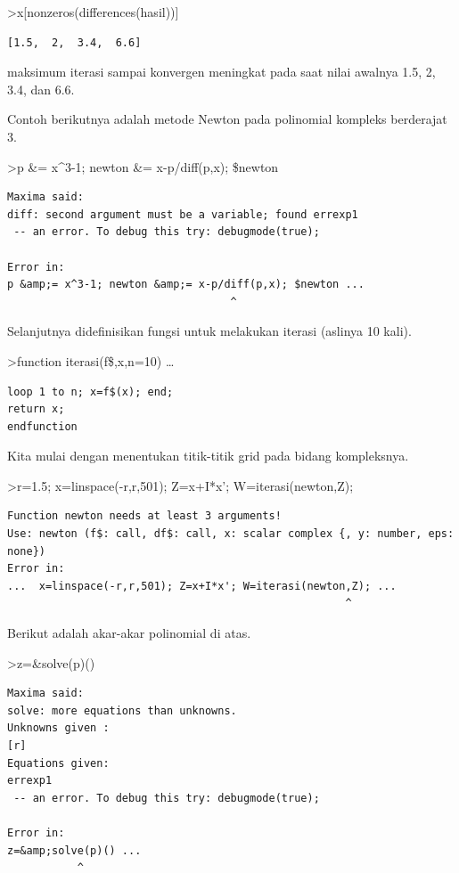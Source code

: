 \documentclass[
]{book}
\begin{document}
\textgreater x{[}nonzeros(differences(hasil)){]}

\begin{verbatim}
[1.5,  2,  3.4,  6.6]
\end{verbatim}

maksimum iterasi sampai konvergen meningkat pada saat nilai awalnya 1.5, 2, 3.4, dan 6.6.

Contoh berikutnya adalah metode Newton pada polinomial kompleks berderajat 3.

\textgreater p \&= x\^{}3-1; newton \&= x-p/diff(p,x); \$newton

\begin{verbatim}
Maxima said:
diff: second argument must be a variable; found errexp1
 -- an error. To debug this try: debugmode(true);

Error in:
p &amp;= x^3-1; newton &amp;= x-p/diff(p,x); $newton ...
                                   ^
\end{verbatim}

Selanjutnya didefinisikan fungsi untuk melakukan iterasi (aslinya 10 kali).

\textgreater function iterasi(f\$,x,n=10) \ldots{}

\begin{verbatim}
loop 1 to n; x=f$(x); end;
return x;
endfunction
\end{verbatim}

Kita mulai dengan menentukan titik-titik grid pada bidang kompleksnya.

\textgreater r=1.5; x=linspace(-r,r,501); Z=x+I*x'; W=iterasi(newton,Z);

\begin{verbatim}
Function newton needs at least 3 arguments!
Use: newton (f$: call, df$: call, x: scalar complex {, y: number, eps: none}) 
Error in:
...  x=linspace(-r,r,501); Z=x+I*x'; W=iterasi(newton,Z); ...
                                                     ^
\end{verbatim}

Berikut adalah akar-akar polinomial di atas.

\textgreater z=\&solve(p)()

\begin{verbatim}
Maxima said:
solve: more equations than unknowns.
Unknowns given :  
[r]
Equations given:  
errexp1
 -- an error. To debug this try: debugmode(true);

Error in:
z=&amp;solve(p)() ...
           ^
\end{verbatim}
\end{document}
